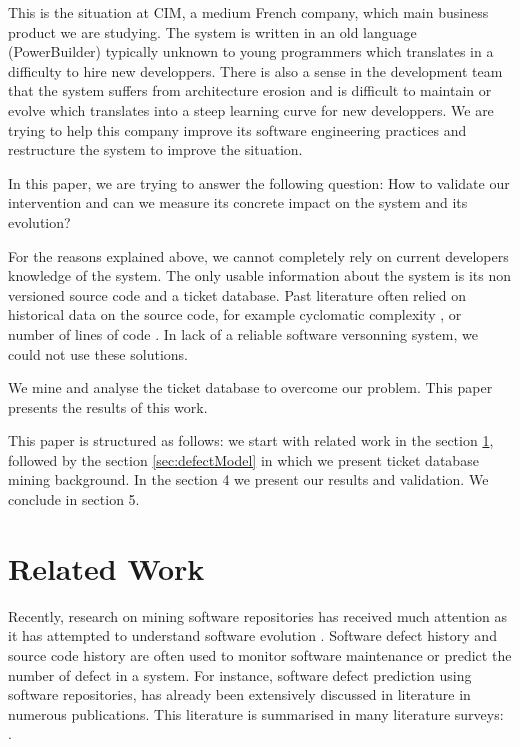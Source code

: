 \documentclass[10pt,conference]{IEEEtran}
\begin{document}
This is the situation at CIM, a medium French company, which main business product we are studying.
The system is written in an old language (PowerBuilder) typically unknown to young programmers which translates in a difficulty to hire new developpers.
There is also a sense in the development team that the system suffers from architecture erosion and is difficult to maintain or evolve which translates into a steep learning curve for new developpers.
We are trying to help this company improve its software engineering practices and restructure the system to improve the situation.

In this paper, we are trying to answer the following question:
How to validate our intervention and can we measure its concrete impact on the system and its evolution?

For the reasons explained above, we cannot completely rely on current developers knowledge of the system.
The only usable information about the system is its non versioned source code and a ticket database.
Past literature often relied on historical data on the source code, for example
cyclomatic complexity \cite{gill91}, or number of lines of code \cite{port18}.
In lack of a reliable software versonning system, we could not use these solutions.

We mine and analyse the ticket database to overcome our problem.
This paper presents the results of this work.

 This paper is structured as follows: we start with related work in the section \ref{sec:related-work}, followed by  the section \ref{sec:defectModel}  in which we present ticket database mining background. 
 In the section 4 we present our results and validation. We  conclude in section 5.
 
\section{Related Work}
\label{sec:related-work}
Recently, research on mining software repositories has received much attention as it has attempted to  understand  software  evolution \cite{Zhan10a}. Software defect history and source code history are often used to monitor software maintenance or predict the number of defect in a system. 
For instance, software defect prediction using software repositories, has already been extensively discussed in literature in numerous publications.
This literature is summarised in many literature surveys: \cite{Catal09,Hall12,Hoss17,Li19a,malh15}.
\end{document}
